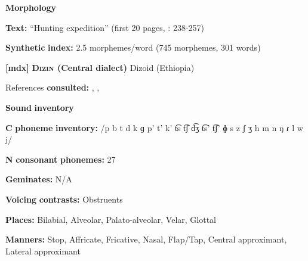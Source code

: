 \documentclass[output=paper]{langsci/langscibook}
\begin{document}
\begin{styleBody}
\textbf{Morphology}
\end{styleBody}

\begin{styleBody}
\textbf{Text:} “Hunting expedition” (first 20 pages, \citealt{Whitehead2004}: 238-257)
\end{styleBody}

\begin{styleBody}
\textbf{Synthetic} \textbf{index:} 2.5 morphemes/word (745 morphemes, 301 words)
\end{styleBody}

\begin{styleBody}
\textbf{[mdx]}   \textbf{\textsc{Dizin} \textbf{(Central} \textbf{dialect)}}  Dizoid (Ethiopia)
\end{styleBody}

\begin{styleBody}
References \textbf{consulted:} \citet{Allan1976}, \citet{Beachy2005}, \citet{Breeze1988}
\end{styleBody}

\begin{styleBody}
\textbf{Sound} \textbf{inventory}
\end{styleBody}

\begin{styleBody}
\textbf{C} \textbf{phoneme} \textbf{inventory:} /p b t d k ɡ p’ t’ k’ t͡s t͡ʃ d͡ʒ t͡s’ t͡ʃ’ ɸ s z ʃ ʒ h m n ŋ ɾ l w j/
\end{styleBody}

\begin{styleBody}
\textbf{N} \textbf{consonant} \textbf{phonemes:} 27
\end{styleBody}

\begin{styleBody}
\textbf{Geminates:} N/A
\end{styleBody}

\begin{styleBody}
\textbf{Voicing} \textbf{contrasts:} Obstruents
\end{styleBody}

\begin{styleBody}
\textbf{Places:} Bilabial, Alveolar, Palato-alveolar, Velar, Glottal
\end{styleBody}

\begin{styleBody}
\textbf{Manners:} Stop, Affricate, Fricative, Nasal, Flap/Tap, Central approximant, Lateral approximant
\end{styleBody}
\end{document}
